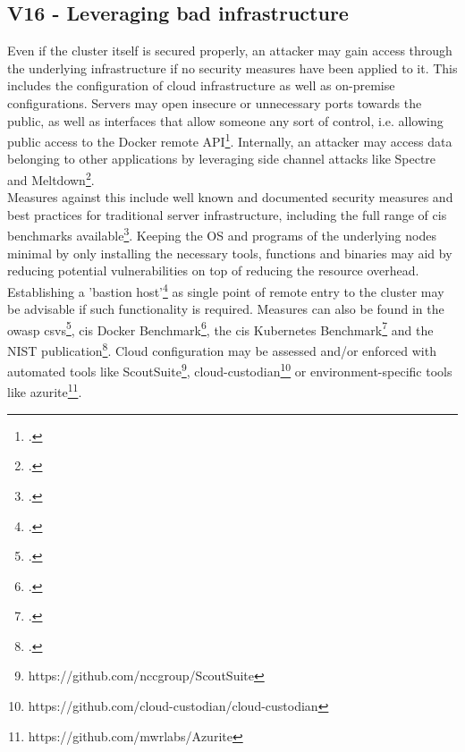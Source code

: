 \newpage
\subsection{V16 - Leveraging bad infrastructure} \label{v16}
Even if the cluster itself is secured properly, an attacker may gain access through the underlying infrastructure if no security measures have been applied to it.
This includes the configuration of cloud infrastructure as well as on-premise configurations.
Servers may open insecure or unnecessary ports towards the public, as well as interfaces that allow someone any sort of control, i.e. allowing public access to the Docker remote API\footcite[][, section 'Publicly Accessible Docker Hosts']{dockerRemoteAccess}.
Internally, an attacker may access data belonging to other applications by leveraging side channel attacks like Spectre and Meltdown\footcite[][, section 'Which cloud providers are affected by Meltdown?']{spectreMeltdown}. \\
Measures against this include well known and documented security measures and best practices for traditional server infrastructure, including the full range of \gls{cis} benchmarks available\footcite[][, refer to the list presented]{cisBenchmarkList}.
Keeping the OS and programs of the underlying nodes minimal by only installing the necessary tools, functions and binaries may aid by reducing potential vulnerabilities on top of reducing the resource overhead.
Establishing a 'bastion host'\footcite[][, section 'What is a bastion host, and do I need one?']{bastionHostAws} as single point of remote entry to the cluster may be advisable if such functionality is required.
Measures can also be found in the \gls{owasp} \gls{csvs}\footcite[][, section 'Infrastructure']{csvsGithub}, \gls{cis} Docker Benchmark\footcite[][, chapters 1 through 3 and 5]{cisDocker}, the \gls{cis} Kubernetes Benchmark\footcite[][, chapters 'Worker Node Security Configuration' and 'Configuration Files']{cisK8s} and the NIST publication\footcite[][, chapters 3.5, 4.5 and 4.6]{nistK8s}.
Cloud configuration may be assessed and/or enforced with automated tools like ScoutSuite\footnote{https://github.com/nccgroup/ScoutSuite},
\renewcommand*{\thefootnote}{\roman{footnote}}
\setcounter{footnote}{0}
 cloud-custodian\footnote{https://github.com/cloud-custodian/cloud-custodian} or environment-specific tools like azurite\footnote{https://github.com/mwrlabs/Azurite}.

\newpage
\renewcommand*{\thefootnote}{\arabic{footnote}}
\setcounter{footnote}{0}
